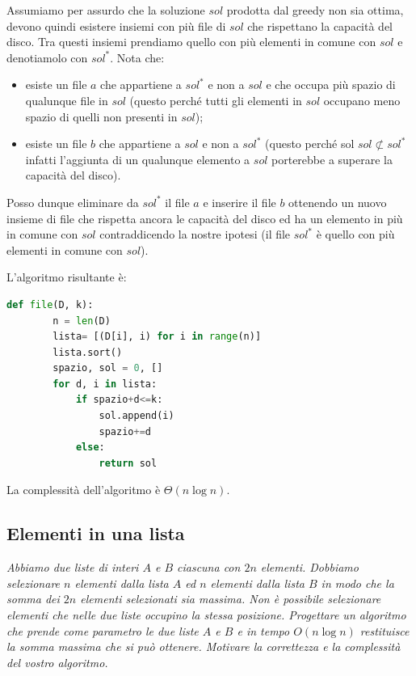     \begin{demonstration}
        Assumiamo per assurdo che la soluzione $sol$ prodotta dal greedy non sia ottima, devono quindi esistere insiemi con più file di $sol$ che rispettano la capacità del disco. Tra questi insiemi prendiamo quello con più elementi in comune con $sol$ e denotiamolo con $sol^*$. Nota che:
        \begin{itemize}
            \item esiste un file $a$ che appartiene a $sol^*$ e non a $sol$ e che occupa più spazio di qualunque file in $sol$ (questo perché tutti gli elementi in $sol$ occupano meno spazio di quelli non presenti in $sol$);
            \item esiste un file $b$ che appartiene a $sol$ e non a $sol^*$ (questo perché sol $sol\not\subset sol^*$ infatti l'aggiunta di un qualunque elemento a $sol$ porterebbe a superare la capacità del disco).
        \end{itemize}
        Posso dunque eliminare da $sol^*$ il file $a$ e inserire il file $b$ ottenendo un nuovo insieme di file che rispetta ancora le capacità del disco ed ha un elemento in più in comune con $sol$ contraddicendo la nostre ipotesi (il file $sol^*$ è quello con più elementi in comune con $sol$).
    \end{demonstration}

    L'algoritmo risultante è:
    \begin{lstlisting}[language=Python]
    def file(D, k):
        n = len(D)
        lista= [(D[i], i) for i in range(n)]
        lista.sort()
        spazio, sol = 0, []
        for d, i in lista:
            if spazio+d<=k:
                sol.append(i)
                spazio+=d
            else:
                return sol
    \end{lstlisting}
    La complessità dell'algoritmo è $\Theta(n \log n)$.

\subsection{Elementi in una lista}
    \textit{Abbiamo due liste di interi $A$ e $B$ ciascuna con $2n$ elementi. Dobbiamo selezionare $n$ elementi dalla lista $A$ ed $n$ elementi dalla lista $B$ in modo che la somma dei $2n$ elementi selezionati sia massima. Non è possibile selezionare elementi che nelle due liste occupino la stessa posizione. Progettare un algoritmo che prende come parametro le due liste $A$ e $B$ e in tempo $O(n\log n)$ restituisce la somma massima che si può ottenere. Motivare la correttezza e la complessità del vostro algoritmo.}

